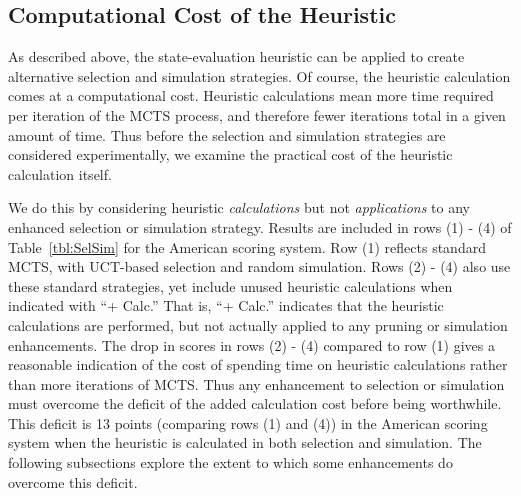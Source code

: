 \documentclass[letterpaper]{article}
\begin{document}


\subsection{Computational Cost of the Heuristic}

As described above, the state-evaluation heuristic can be applied to create alternative selection and simulation strategies. Of course, the heuristic calculation comes at a computational cost. Heuristic calculations mean more time required per iteration of the MCTS process, and therefore fewer iterations total in a given amount of time. Thus before the selection and simulation strategies are considered experimentally, we examine the practical cost of the heuristic calculation itself.

We do this by considering heuristic {\it calculations} but not {\it applications} to any enhanced selection or simulation strategy. Results are included in rows (1) - (4) of Table~\ref{tbl:SelSim} for the American scoring system. Row (1) reflects standard MCTS, with UCT-based selection and random simulation. Rows (2) - (4) also use these standard strategies, yet include unused heuristic calculations when indicated with ``+ Calc.'' That is, ``+ Calc.'' indicates that the heuristic calculations are performed, but not actually applied to any pruning or simulation enhancements. The drop in scores in rows (2) - (4) compared to row (1) gives a reasonable indication of the cost of spending time on heuristic calculations rather than more iterations of MCTS. Thus any enhancement to selection or simulation must overcome the deficit of the added calculation cost before being worthwhile. This deficit is 13 points (comparing rows (1) and (4)) in the American scoring system when the heuristic is calculated in both selection and simulation. The following subsections explore the extent to which some enhancements do overcome this deficit.
\end{document}
